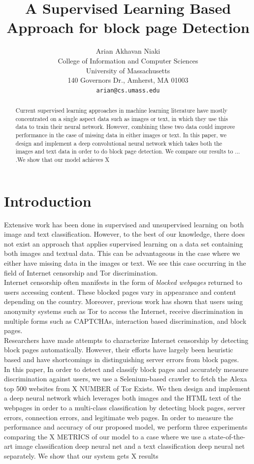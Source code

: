 \documentclass{article} %
\title{A Supervised Learning Based Approach for block page Detection}
\author{
Arian Akhavan Niaki\\
College of Information and Computer Sciences\\
University of Massachusetts\\
140 Governors Dr., Amherst, MA 01003 \\
\texttt{arian@cs.umass.edu} \\
}
\begin{document}
\maketitle

\begin{abstract}
Current supervised learning approaches in machine learning literature have mostly concentrated on a single aspect data such as images or text, in which they use this data to train their neural network. However, combining these two data could improve performance in the case of missing data in either images or text. In this paper, we design and implement a deep convolutional neural network which takes both the images and text data in order to do block page detection. We compare our results to ... .We show that our model achieves X 
\end{abstract}
\section{Introduction}
Extensive work has been done in supervised and unsupervised learning on both image and text classification. However, to the best of our knowledge, there does not exist an approach that applies supervised learning on a data set containing both images and textual data. This can be advantageous in the case where we either have missing data in the images or text. We see this case occurring in the field of Internet censorship and Tor discrimination.\\
Internet censorship often manifests in the form of \emph{blocked webpages} returned to users accessing content. These blocked pages vary in appearance and content depending on the country. 
Moreover, previous work has shown that users using anonymity systems such as Tor to access the Internet, receive discrimination in multiple forms such as CAPTCHAs, interaction based discrimination, and block pages. \\
Researchers have made attempts to characterize Internet censorship by detecting block pages automatically. However, their efforts have largely been heuristic based and have shortcomings in distinguishing server errors from block pages.\\
In this paper, In order to detect and classify block pages and accurately measure discrimination against users, we use a Selenium-based crawler to fetch the Alexa top 500 websites from X NUMBER of Tor Exists. We then design and implement a deep neural network which leverages both images and the HTML text of the webpages in order to a multi-class classification by detecting block pages, server errors, connection errors, and legitimate web pages. In order to measure the performance and accuracy of our proposed model, we perform three experiments comparing the X METRICS of our model to a case where we use a state-of-the-art image classification deep neural net and a text classification deep neural net separately. We show that our system gets X results
\end{document}
